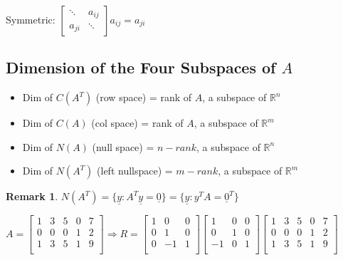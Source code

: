 \documentclass[12pt,a4paper]{article}
\newtheorem*{rem}{Remark}
\newcommand{\Remark}[1]{
  \begin{rem}
    \color{cyan}
    #1
  \end{rem}
}
\begin{document}
Symmetric:
$
\begin{bmatrix}
  \ddots & a_{ij} \\
  a_{ji} & \ddots
\end{bmatrix}
a_{ij} = a_{ji}
$

\subsection*{Dimension of the Four Subspaces of $A$}

\begin{itemize}
  \item Dim of $C(A^T)$ (row space) = rank of $A$, a subspace of $\mathbb{R}^n$
  \item Dim of $C(A)$ (col space) = rank of $A$, a subspace of $\mathbb{R}^m$
  \item Dim of $N(A)$ (null space) = $n - rank$, a subspace of $\mathbb{R}^n$
  \item Dim of $N(A^T)$ (left nullspace) = $m - rank$, a subspace of $\mathbb{R}^m$
\end{itemize}

\Remark{$N(A^T) = \{\underline{y}: A^T\underline{y} = \underline{0}\} = \{\underline{y}: y^TA = \underline{0}^T\}$}

$
A = 
\begin{bmatrix}
  1 & 3 & 5 & 0 & 7 \\
  0 & 0 & 0 & 1 & 2 \\
  1 & 3 & 5 & 1 & 9 \\
\end{bmatrix} \Rightarrow
R = 
\begin{bmatrix}
  1 & 0 & 0 \\
  0 & 1 & 0 \\
  0 & -1 & 1 \\
\end{bmatrix}
\begin{bmatrix}
  1 & 0 & 0 \\
  0 & 1 & 0 \\
  -1 & 0 & 1 \\
\end{bmatrix}
\begin{bmatrix}
  1 & 3 & 5 & 0 & 7 \\
  0 & 0 & 0 & 1 & 2 \\
  1 & 3 & 5 & 1 & 9 \\
\end{bmatrix}
$
\end{document}
